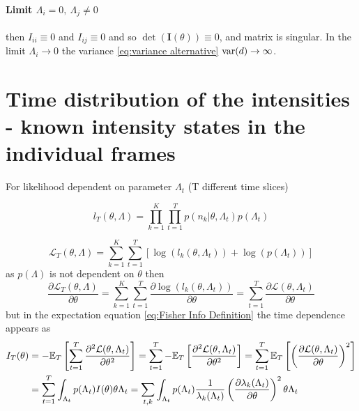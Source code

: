 \paragraph*{Limit $\Lambda_i=0,\ \Lambda_j\neq0$}
then $I_{ii}\equiv0$ and $I_{ij}\equiv0$ and so $\det(\bm{I}(\theta))\equiv0$, and matrix is singular. In the limit $\Lambda_i\rightarrow0$ the
variance \autoref{eq:variance alternative} $\mathrm{var}(d)\rightarrow\infty$. 


\section{Time distribution of the intensities - known intensity states in the individual frames\label{sec:Appendix - blinking not integrated}}
For likelihood dependent on parameter $\Lambda_t$ (T different time slices)

\begin{equation}
	l_T(\theta,\Lambda)=\prod_{k=1}^K\prod_{t=1}^Tp(n_k|\theta,\Lambda_t)p(\Lambda_t)
\end{equation}

\begin{equation}
	\mathcal{L}_T(\theta,\Lambda)=\sum_{k=1}^K\sum_{t=1}^T\left[\log\left(l_k(\theta,\Lambda_t)\right)+\log\left(p(\Lambda_t)\right)\right]
\end{equation}
%
as $p(\Lambda)$ is not dependent on $\theta$ then
%
\begin{equation}
	\frac{\partial\mathcal{L}_T(\theta,\Lambda)}{\partial \theta}=\sum_{k=1}^K\sum_{t=1}^T\frac{\partial\log\left(l_k(\theta,\Lambda_t)\right)}{\partial \theta}=\sum_{t=1}^T\frac{\partial\mathcal{L}(\theta,\Lambda_t)}{\partial \theta}
\end{equation}
%
but in the expectation equation \autoref{eq:Fisher Info Definition} the time dependence appears as
%
\begin{alignat*}{1}
	I_T(\theta) & =-\mathbb{E}_T\left[\sum_{t=1}^T\frac{\partial^2\mathcal{L}(\theta,\Lambda_t)}{\partial \theta^2}\right]=\sum_{t=1}^T-\mathbb{E}_T\left[\frac{\partial^2\mathcal{L}(\theta,\Lambda_t)}{\partial \theta^2}\right]=\sum_{t=1}^T\mathbb{E}_T\left[\left(\frac{\partial\mathcal{L}(\theta,\Lambda_t)}{\partial \theta}\right)^2\right]\\
	& =\sum_{t=1}^T\int_{\Lambda_t}p(\Lambda_t)I(\theta)\theta\Lambda_t=\sum_{t,k}\int_{\Lambda_t}p(\Lambda_t)\frac{1}{\lambda_k(\Lambda_t)}\left(\frac{\partial\lambda_k(\Lambda_t)}{\partial \theta}\right)^2\theta\Lambda_t
\end{alignat*}

